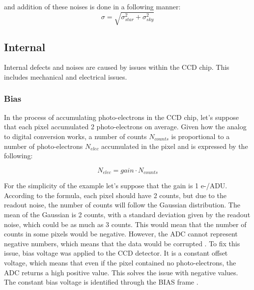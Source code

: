     and addition of these noises is done in a following manner:
    \begin{equation}
    \label{eqn:additionNoises}
        \sigma = \sqrt{\sigma_{star}^2 + \sigma_{sky}^2}
    \end{equation}

\subsection{Internal}

Internal defects and noises are caused by issues within the CCD chip. This includes mechanical and electrical issues. 
 

    \subsubsection{Bias}
    
    In the process of accumulating photo-electrons in the CCD chip, let's suppose that each pixel accumulated 2 photo-electrons on average. Given how the analog to digital conversion works, a number of counts $N_{counts}$ is proportional to a number of photo-electrons $N_{elec}$ accumulated in the pixel and is expressed by the following: 
        
    \begin{equation}
    \label{eqn:bias}
        N_{elec}  = gain \cdot N_{counts}
    \end{equation}
    
    For the simplicity of the example let's suppose that the gain is 1 e-/ADU. According to the formula, each pixel should have 2 counts, but due to the readout noise, the number of counts will follow the Gaussian distribution. The mean of the Gaussian is 2 counts, with a standard deviation given by the readout noise, which could be as much as 3 counts. This would mean that the number of counts in some pixels would be negative. However, the ADC cannot represent negative numbers, which means that the data would be corrupted \cite{articleCCDartifacts} \cite{phy217}.
    To fix this issue, bias voltage was applied to the CCD detector. It is a constant offset voltage, which means that even if the pixel contained no photo-electrons, the ADC returns a high positive value. This solves the issue with negative values. The constant bias voltage is identified through the BIAS frame \cite{articleCCDartifacts} \cite{phy217}.
    
        
 
